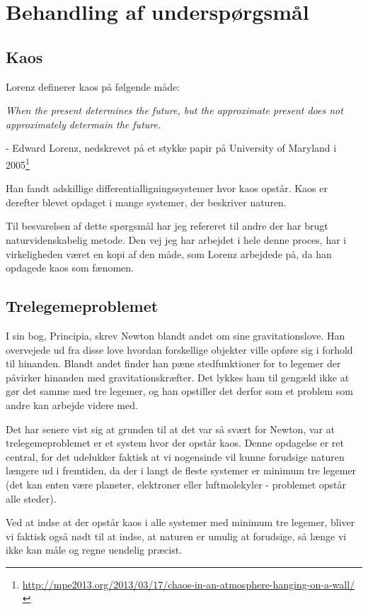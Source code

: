 \documentclass[12pt,a4paper]{article}
\theoremstyle{break}
\theoremstyle{nonumberplain}
\begin{document}
\section{Behandling af underspørgsmål}

\subsection{Kaos}
Lorenz definerer kaos på følgende måde:
\begin{displayquote}
\textit{When the present determines the future, but the approximate present does not approximately determain the future.}

- Edward Lorenz, nedskrevet på et stykke papir på University of Maryland i 2005\footnote{\url{http://mpe2013.org/2013/03/17/chaos-in-an-atmosphere-hanging-on-a-wall/}}

\end{displayquote}
	
Han fandt adskillige differentialligningssystemer hvor kaos opstår.
Kaos er derefter blevet opdaget i mange systemer, der beskriver naturen. 

Til besvarelsen af dette spørgsmål har jeg refereret til andre der har brugt naturvidenskabelig metode. 
Den vej jeg har arbejdet i hele denne proces, har i virkeligheden været en kopi af den måde, som Lorenz arbejdede på, da han opdagede kaos som fænomen.

\subsection{Trelegemeproblemet}
I sin bog, Principia, skrev Newton blandt andet om sine gravitationslove. 
Han overvejede ud fra disse love hvordan forskellige objekter ville opføre sig i forhold til hinanden. 
Blandt andet finder han pæne stedfunktioner for to legemer der påvirker hinanden med gravitationskræfter. 
Det lykkes ham til gengæld ikke at gør det samme med tre legemer, og han opstiller det derfor som et problem som andre kan arbejde videre med. 

Det har senere vist sig at grunden til at det var så svært for Newton, var at trelegemeproblemet er et system hvor der opstår kaos. 
Denne opdagelse er ret central, for det udelukker faktisk at vi nogensinde vil kunne forudsige naturen længere ud i fremtiden, da der i langt de fleste systemer er minimum tre legemer (det kan enten være planeter, elektroner eller luftmolekyler - problemet opstår alle steder).

Ved at indse at der opstår kaos i alle systemer med minimum tre legemer, bliver vi faktisk også nødt til at indse, at naturen er umulig at forudsige, så længe vi ikke kan måle og regne uendelig præcist.
\end{document}
